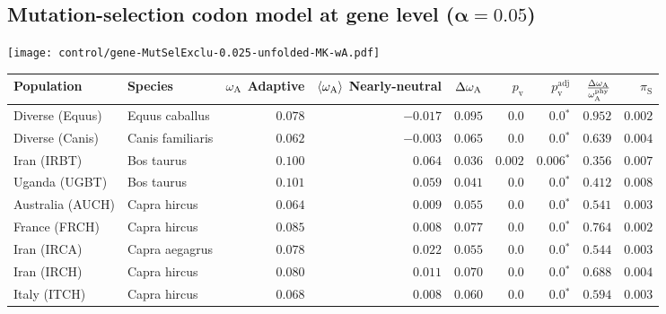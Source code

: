 \subsection{Mutation-selection codon model at gene level ($\bm{\alpha=0.05}$)}
\begin{center}
    \texttt{[image: control/gene-MutSelExclu-0.025-unfolded-MK-wA.pdf]}
    \begin{adjustbox}{width = 1\textwidth}
        \begin{tabular}{|l|l|r|r|r|r|r|r|r|}
            \toprule
            Population & Species & \specialcell{$\omega_{\mathrm{A}}$ \\ Adaptive}                & \specialcell{$\left< \omega_{\mathrm{A}} \right>$ \\ Nearly-neutral}                & $\Delta \omega_{\mathrm{A}} $    & $p_{\mathrm{v}}$ & $p_{\mathrm{v}}^{\mathrm{adj}}$  & $\frac{\Delta\omega_{\mathrm{A}}}{\omega_{\mathrm{A}}^{\mathrm{phy}}}$ & $\pi_{\textrm{S}}$    \\
            \midrule
            Diverse (Equus)                    & Equus caballus          & $ 0.078$ & $-0.017$  & $ 0.095$ & $0.0$ & $\bm{0.0{^*}}$ & $ 0.952$ & $ 0.002$ \\
            Diverse (Canis)                  & Canis familiaris          & $ 0.062$ & $-0.003$  & $ 0.065$ & $0.0$    & $\bm{0.0{^*}}$    & $ 0.639$ & $ 0.004$ \\
            Iran (IRBT)               & Bos taurus        & $ 0.100$ & $ 0.064$  & $ 0.036$ & $ 0.002$    & $\bm{ 0.006{^*}}$    & $ 0.356$ & $ 0.007$ \\
            Uganda (UGBT)                  & Bos taurus        & $ 0.101$ & $ 0.059$  & $ 0.041$ & $0.0$    & $\bm{0.0{^*}}$    & $ 0.412$ & $ 0.008$ \\
            Australia (AUCH)                    & Capra hircus      & $ 0.064$ & $ 0.009$  & $ 0.055$ & $0.0$    & $\bm{0.0{^*}}$    & $ 0.541$ & $ 0.003$ \\
            France (FRCH)                    & Capra hircus        & $ 0.085$ & $ 0.008$  & $ 0.077$ & $0.0$    & $\bm{0.0{^*}}$    & $ 0.764$ & $ 0.002$ \\
            Iran (IRCA)                   & Capra aegagrus        & $ 0.078$ & $ 0.022$  & $ 0.055$ & $0.0$    & $\bm{0.0{^*}}$    & $ 0.544$ & $ 0.003$ \\
            Iran (IRCH)                 & Capra hircus        & $ 0.080$ & $ 0.011$  & $ 0.070$ & $0.0$    & $\bm{0.0{^*}}$    & $ 0.688$ & $ 0.004$ \\
            Italy (ITCH)                    & Capra hircus          & $ 0.068$ & $ 0.008$  & $ 0.060$ & $0.0$    & $\bm{0.0{^*}}$    & $ 0.594$ & $ 0.003$ \\

\end{tabular}
\end{adjustbox}
\end{center}
